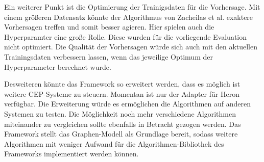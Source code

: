 Ein weiterer Punkt ist die Optimierung der Trainigsdaten für die Vorhersage.
Mit einem größeren Datensatz könnte der Algorithmus von Zacheilas et al. exaktere Vorhersagen treffen und somit besser agieren.
Hier spielen auch die Hyperparamter eine große Rolle.
Diese wurden für die vorliegende Evaluation nicht optimiert.
Die Qualität der Vorhersagen würde sich auch mit den aktuellen Trainingsdaten verbessern lassen, wenn das jeweilige Optimum der Hyperparameter berechnet wurde.

Desweiteren könnte das Framework so erweitert werden, dass es möglich ist weitere CEP-Systeme zu steuern.
Momentan ist nur der Adapter für Heron verfügbar.
Die Erweiterung würde es ermöglichen die Algorithmen auf anderen Systemen zu testen.
Die Möglichkeit noch mehr verschiedene Algorithmen miteinander zu vergleichen sollte ebenfalls in Betracht gezogen werden.
Das Framework stellt das Graphen-Modell als Grundlage bereit, sodass weitere Algorithmen mit weniger Aufwand für die Algorithmen-Bibliothek des Frameworks implementiert werden können.
